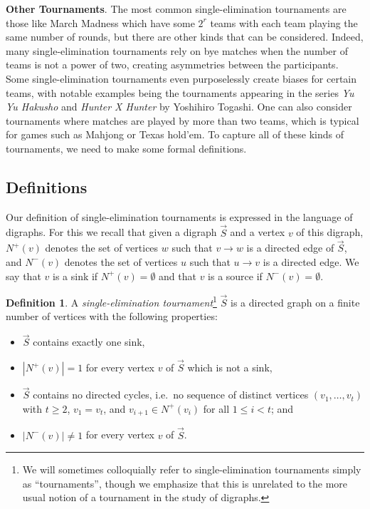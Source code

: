 \documentclass[12pt,letterpaper]{article}
\theoremstyle{definition}
\newtheorem{defn}{Definition}
\renewcommand{\1}{\mathbbm{1}}
\newcommand{\tour}{\vec{S}}
\begin{document}
\textbf{Other Tournaments}.  The most common single-elimination tournaments are those like March Madness which have some $2^r$ teams with each team playing the same number of rounds, but there are other kinds that can be considered.  Indeed, many single-elimination tournaments rely on bye matches when the number of teams is not a power of two, creating asymmetries between the participants.  Some single-elimination tournaments even purposelessly create biases for certain teams, with notable examples being the tournaments appearing in the series \textit{Yu Yu Hakusho} and \textit{Hunter X Hunter} by Yoshihiro Togashi.  One can also consider tournaments where matches are played by more than two teams, which is typical for games such as Mahjong or Texas hold'em.   To capture all of these kinds of tournaments, we need to make some formal definitions. %

\subsection{Definitions}

Our definition of single-elimination tournaments is expressed in the language of digraphs.  For this we recall that given a digraph $\tour$ and a vertex $v$ of this digraph, $N^+(v)$ denotes the set of vertices $w$ such that $v\to w$ is a directed edge of $\tour$, and $N^-(v)$ denotes the set of vertices $u$ such that $u\to v$ is a directed edge.  We say that $v$ is a sink if $N^+(v)=\emptyset$ and that $v$ is a source if $N^-(v)=\emptyset$.



\begin{defn}
	A \textit{single-elimination tournament}\footnote{We will sometimes colloquially refer to single-elimination tournaments simply as ``tournaments'', though we emphasize that this is unrelated to the more usual notion of a tournament in the study of digraphs.} $\tour$ is a directed graph on a finite number of vertices with the following properties: 
	\begin{itemize}
		\item[(a)] $\tour$ contains exactly one sink,
		\item[(b)] $|N^+(v)|=1$ for every vertex $v$ of $\tour$ which is not a sink, 
		\item[(c)] $\tour$ contains no directed cycles, i.e.\ no sequence of distinct vertices $(v_1,\ldots,v_t)$ with $t\ge 2$, $v_1=v_t$, and $v_{i+1}\in N^+(v_i)$ for all $1\le i<t$; and
		\item[(d)] $|N^-(v)|\ne 1$ for every vertex $v$ of $\tour$.
	\end{itemize}
\end{defn}
\end{document}
